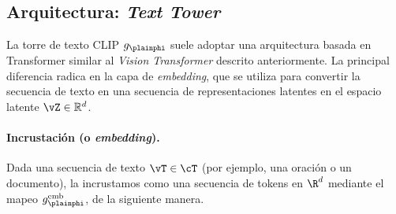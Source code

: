 \documentclass[../../book-main_es.tex]{subfiles}
\begin{document}
\subsection{Arquitectura: \textit{Text Tower}}
La torre de texto CLIP \(g_{\plainphi}\) suele adoptar una arquitectura basada en Transformer similar 
al \textit{Vision Transformer} descrito anteriormente. La principal diferencia radica en la capa de \textit{embedding}, 
que se utiliza para convertir la secuencia de texto en una secuencia de representaciones latentes en el 
espacio latente \(\vZ \in \mathbb{R}^{d}\).

\paragraph{Incrustación (o \textit{embedding}).} Dada una secuencia de texto \(\vT \in \cT\) (por ejemplo, una
oración o un documento), la incrustamos como una secuencia de tokens en
\(\R^d\) mediante el mapeo \(g_{\plainphi}^{\text{emb}}\), de la siguiente manera.
\end{document}
